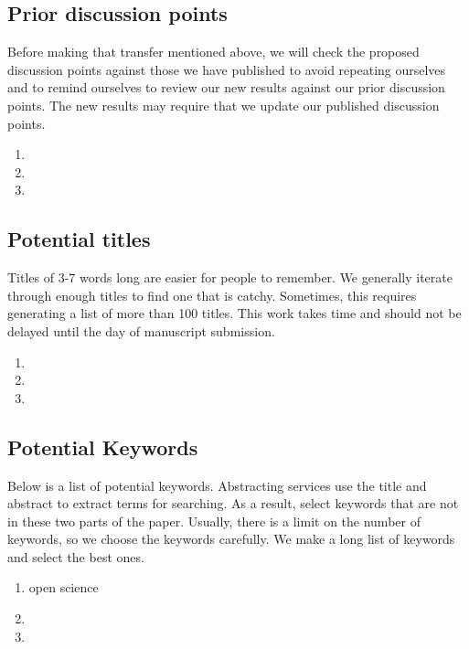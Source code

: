 \documentclass[10pt,letterpaper]{article}
\newcommand{\be}{\begin{enumerate}}
\newcommand{\ee}{\end{enumerate}}
\begin{document}
\subsection{Prior discussion points}
\label{subsec:priorDiscussion}
Before making that transfer mentioned above, we will check the proposed discussion points against those we have published to avoid repeating ourselves and to remind ourselves to review our new results against our prior discussion points.
The new results may require that we update our published discussion points.

\begin{enumerate}
  \item 
  \item
  \item
\end{enumerate}



\subsection{Potential titles}
\label{sub:titles}

Titles of 3-7 words long are easier for people to remember.
We generally iterate through enough titles to find one that is catchy.
Sometimes, this requires generating a list of more than 100 titles.
This work takes time and should not be delayed until the day of manuscript submission.


\begin{enumerate}
  \item 
  \item 
  \item
\end{enumerate}



\subsection*{Potential Keywords}
\label{sub:keywords}

Below is a list of potential keywords.
Abstracting services use the title and abstract to extract terms for searching.
As a result, select keywords that are not in these two parts of the paper.
Usually, there is a limit on the number of keywords, so we choose the keywords carefully.
We make a long list of keywords and select the best ones.              
\be
    \item open science
    \item 
    \item 
\ee
\end{document}
